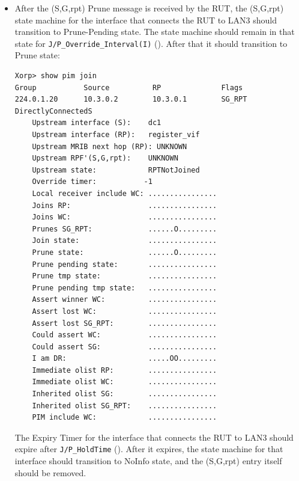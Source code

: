 \documentclass[11pt]{report}
\begin{document}

\begin{itemize}

  \item After the (S,G,rpt) Prune message is received by the RUT,
  the (S,G,rpt) state machine for the interface that connects the RUT to
  LAN3 should transition to Prune-Pending state. The state machine should
  remain in that state for \verb=J/P_Override_Interval(I)=
  ({\PimsmJPOverrideIntervalI}). After that it should transition to Prune
  state:

\begin{verbatim}
Xorp> show pim join 
Group           Source          RP              Flags
224.0.1.20      10.3.0.2        10.3.0.1        SG_RPT DirectlyConnectedS 
    Upstream interface (S):    dc1
    Upstream interface (RP):   register_vif
    Upstream MRIB next hop (RP): UNKNOWN
    Upstream RPF'(S,G,rpt):    UNKNOWN
    Upstream state:            RPTNotJoined 
    Override timer:           -1
    Local receiver include WC: ................
    Joins RP:                  ................
    Joins WC:                  ................
    Prunes SG_RPT:             ......O.........
    Join state:                ................
    Prune state:               ......O.........
    Prune pending state:       ................
    Prune tmp state:           ................
    Prune pending tmp state:   ................
    Assert winner WC:          ................
    Assert lost WC:            ................
    Assert lost SG_RPT:        ................
    Could assert WC:           ................
    Could assert SG:           ................
    I am DR:                   .....OO.........
    Immediate olist RP:        ................
    Immediate olist WC:        ................
    Inherited olist SG:        ................
    Inherited olist SG_RPT:    ................
    PIM include WC:            ................
\end{verbatim}

  The Expiry Timer for the interface that connects the RUT to LAN3
  should expire after \verb=J/P_HoldTime= ({\PimsmJPHoldTime}).
  After it expires, the state machine for that interface should transition to
  NoInfo state, and the (S,G,rpt) entry itself should be removed.

\end{itemize}

\end{document}
